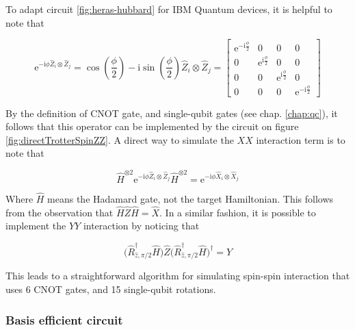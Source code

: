    To adapt circuit \ref{fig:heras-hubbard} for IBM Quantum devices, it is helpful to note that

    \begin{equation}
      \mathrm{e}^{-\mathrm{i}\phi \hat{Z}_i \otimes \hat{Z}_j} = \cos(\frac{\phi}{2}) - \mathrm{i}\sin(\frac{\phi}{2}) \hat{Z}_i \otimes \hat{Z}_j = 
      \begin{bmatrix}
        \mathrm{e}^{-\mathrm{i}\frac{\phi}{2}} & 0 & 0 & 0 \\
        0 & \mathrm{e}^{\mathrm{i}\frac{\phi}{2}} & 0 & 0 \\
        0 & 0 & \mathrm{e}^{\mathrm{i}\frac{\phi}{2}} & 0 \\
        0 & 0 & 0 & \mathrm{e}^{-\mathrm{i}\frac{\phi}{2}}
      \end{bmatrix}
      \label{eq:expZZ}
    \end{equation}

    By the definition of CNOT gate, and single-qubit gates (see chap. \ref{chap:qc}), it follows that this operator can be implemented by the circuit on figure \ref{fig:directTrotterSpinZZ}. A direct way to simulate the $XX$ interaction term is to note that

    \begin{equation}
      \hat{H}^{\otimes 2} \mathrm{e}^{-\mathrm{i}\phi \hat{Z}_i \otimes \hat{Z}_j} \hat{H}^{\otimes 2} = \mathrm{e}^{-\mathrm{i}\phi \hat{X}_i \otimes \hat{X}_j}
      \label{eq:Z2X}
    \end{equation}

    Where $\hat{H}$ means the Hadamard gate, not the target Hamiltonian. This follows from the observation that $\hat{H}\hat{Z}\hat{H} = \hat{X}$. In a similar fashion, it is possible to implement the $YY$ interaction by noticing that

    \begin{equation}
      \Big(\hat{R}_{\hat{z}, \pi/2}^{\dagger}\hat{H}\Big)\hat{Z}\Big(\hat{R}_{\hat{z}, \pi/2}^{\dagger}\hat{H}\Big)^{\dagger} = \hat{Y}
      \label{eq:Z2Y}
    \end{equation}

    

    This leads to a straightforward algorithm for simulating spin-spin interaction that uses 6 CNOT gates, and 15 single-qubit rotations. 
  
  \subsubsection{Basis efficient circuit}
  \label{subsec:BasisEfficientCircuit}

